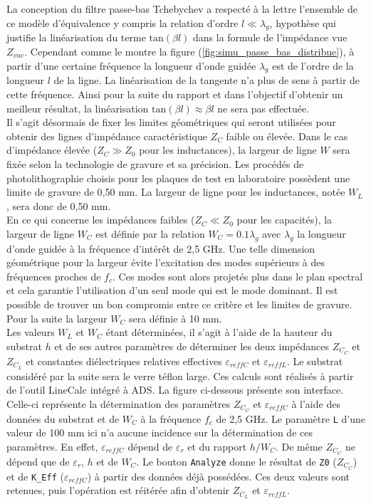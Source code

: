 \documentclass[french]{article}
\begin{document}
\newpage

La conception du filtre passe-bas Tchebychev a respecté à la lettre l'ensemble de ce modèle d'équivalence y compris la relation d'ordre $l \ll \lambda_g$, hypothèse qui justifie la linéarisation du terme $\mbox{tan}(\beta l)$ dans la formule de l'impédance vue $Z_{vue}$. Cependant comme le montre la figure (\ref{fig:simu_passe_bas_distribue}), à partir d'une certaine fréquence la longueur d'onde guidée $\lambda_g$ est de l'ordre de la longueur $l$ de la ligne. La linéarisation de la tangente n'a plus de sens à partir de cette fréquence. Ainsi pour la suite du rapport et dans l'objectif d'obtenir un meilleur résultat, la linéarisation $\mbox{tan}(\beta l) \approx \beta l$ ne sera pas effectuée.\\

Il s'agit désormais de fixer les limites géométriques qui seront utilisées pour obtenir des lignes d'impédance caractéristique $Z_C$ faible ou élevée. Dans le cas d'impédance élevée ($Z_C \gg Z_0$ pour les inductances), la largeur de ligne $W$ sera fixée selon la technologie de gravure et sa précision. Les procédés de photolithographie choisis pour les plaques de test en laboratoire possèdent une limite de gravure de 0,50 mm. La largeur de ligne pour les inductances, notée $W_L$, sera donc de 0,50 mm.\\
En ce qui concerne les impédances faibles ($Z_C \ll Z_0$ pour les capacités), la largeur de ligne $W_C$ est définie par la relation $W_C = 0.1\lambda_g$ avec $\lambda_g$ la longueur d'onde guidée à la fréquence d'intérêt de 2,5 GHz. Une telle dimension géométrique pour la largeur évite l'excitation des modes supérieurs à des fréquences proches de $f_c$. Ces modes sont alors projetés plus dans le plan spectral et cela garantie l'utilisation d'un seul mode qui est le mode dominant. Il est possible de trouver un bon compromis entre ce critère et les limites de gravure. Pour la suite la largeur $W_C$ sera définie à 10 mm.\\

Les valeurs $W_L$ et $W_C$ étant déterminées, il s'agit à l'aide de la hauteur du substrat $h$ et de ses autres paramètres de déterminer les deux impédances $Z_{C_C}$ et $Z_{C_L}$ et constantes diélectriques relatives effectives $\varepsilon_{reffC}$ et $\varepsilon_{reffL}$. Le substrat considéré par la suite sera le verre téflon large. Ces calculs sont réalisés à partir de l'outil LineCalc intégré à ADS. La figure ci-dessous présente son interface. Celle-ci représente la détermination des paramètres $Z_{C_C}$ et $\varepsilon_{reffC}$ à l'aide des données du substrat et de $W_C$ à la fréquence $f_c$ de 2,5 GHz. Le paramètre \texttt{L} d'une valeur de 100 mm ici n'a aucune incidence sur la détermination de ces paramètres. En effet, $\varepsilon_{reffC}$ dépend de $\varepsilon_{r}$ et du rapport $h/W_C$. De même $Z_{C_C}$ ne dépend que de $\varepsilon_{r}$, $h$ et de $W_C$. Le bouton \texttt{Analyze} donne le résultat de \texttt{Z0} ($Z_{C_C}$) et de \texttt{K\_Eff} ($\varepsilon_{reffC}$) à partir des données déjà possédées. Ces deux valeurs sont retenues, puis l'opération est réitérée afin d'obtenir $Z_{C_L}$ et $\varepsilon_{reffL}$.
\end{document}
